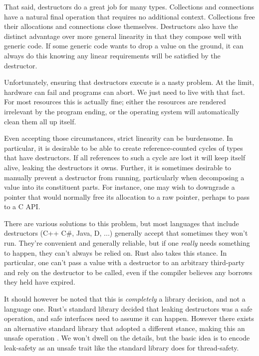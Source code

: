 That said, destructors do a great job for many types. Collections and connections
have a natural final operation that requires no additional context.
Collections free their allocations and connections close themselves.
Destructors also have the distinct advantage over more general linearity in that
they compose well with generic code. If some generic code wants to drop a value
on the ground, it can always do this knowing any linear requirements will be
satisfied by the destructor.

Unfortunately, ensuring that destructors execute is a nasty problem.
At the limit, hardware can fail and programs can abort. We just need to live
with that fact. For most resources this is actually fine; either the resources are
rendered irrelevant by the program ending, or the operating system will automatically
clean them all up itself.

Even accepting those circumstances, strict
linearity can be burdensome. In particular, it is desirable to be able to
create reference-counted cycles of types that have destructors. If all references to
such a cycle are lost it will keep itself alive, leaking the destructors it
owns. Further, it is sometimes desirable to manually prevent a destructor
from running, particularly when decomposing a value into its constituent parts. For
instance, one may wish to downgrade a pointer that would normally free its allocation
to a raw pointer, perhaps to pass to a C API.

There are various solutions to this problem, but most languages that include
destructors (C++ C\#, Java, D, ...) generally accept that sometimes
they won't run. They're convenient and generally
reliable, but if one \emph{really} needs something to happen, they can't always be
relied on. Rust also takes this stance. In particular, one can't pass a value with
a destructor to an arbitrary third-party and rely on the destructor to be called,
even if the compiler believes any borrows they held have expired.

It should however be noted that this is \emph{completely} a library decision,
and not a language one. Rust's standard library decided that leaking destructors
was a safe operation, and safe interfaces need to assume it can happen. However
there exists an alternative standard library that adopted a different stance,
making this an unsafe operation \cite{rust-fork}. We won't dwell on the details,
but the basic idea is to encode leak-safety as an unsafe trait like the standard
library does for thread-safety.


